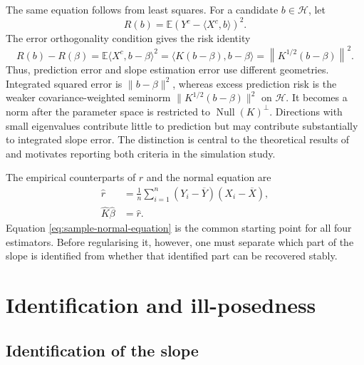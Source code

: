 The same equation follows from least squares. For a candidate $b\in\mathcal H$, let
\begin{equation}
    R(b)=\mathbb E\left(Y^c-\langle X^c,b\rangle\right)^2.
    \label{eq:population-risk}
\end{equation}
The error orthogonality condition gives the risk identity
\begin{equation}
    R(b)-R(\beta)
    =\mathbb E\langle X^c,b-\beta\rangle^2
    =\langle K(b-\beta),b-\beta\rangle
    =\left\|K^{1/2}(b-\beta)\right\|^2.
    \label{eq:prediction-risk-identity}
\end{equation}
Thus, prediction error and slope estimation error use different geometries. Integrated squared error is $\|b-\beta\|^2$, whereas excess prediction risk is the weaker covariance-weighted seminorm $\|K^{1/2}(b-\beta)\|^2$ on $\mathcal H$. It becomes a norm after the parameter space is restricted to $\operatorname{Null}(K)^\perp$. Directions with small eigenvalues contribute little to prediction but may contribute substantially to integrated slope error. The distinction is central to the theoretical results of \textcite{cai_hall_2006} and motivates reporting both criteria in the simulation study.

The empirical counterparts of $r$ and the normal equation are
\begin{align}
    \widehat r
    &=\frac1n\sum_{i=1}^{n}(Y_i-\overline Y)(X_i-\overline X),
    \label{eq:sample-cross-covariance}\\
    \widehat K\widehat\beta
    &=\widehat r.
    \label{eq:sample-normal-equation}
\end{align}
Equation \eqref{eq:sample-normal-equation} is the common starting point for all four estimators. Before regularising it, however, one must separate which part of the slope is identified from whether that identified part can be recovered stably.

\section{Identification and ill-posedness}
\label{sec:identification-illposedness}

\subsection{Identification of the slope}

